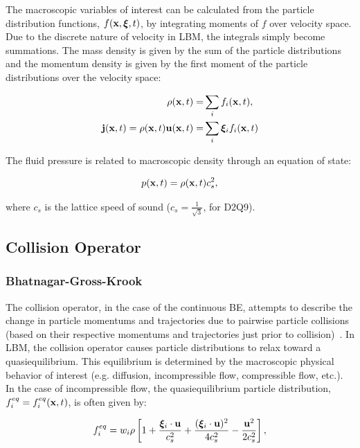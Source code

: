 The macroscopic variables of interest can be calculated from the particle distribution functions, $f(\mathbf{x}, \boldsymbol{\xi}, t)$, by integrating moments of $f$ over velocity space.
Due to the discrete nature of velocity in LBM, the integrals simply become summations.
The mass density is given by the sum of the particle distributions and the momentum density is given by the first moment of the particle distributions over the velocity space:

\begin{align}
\label{eq:rho} \rho(\mathbf{x}, t) =& \sum_{i} f_i(\mathbf{x}, t), \\
\label{eq:mom} \mathbf{j}(\mathbf{x}, t) = \rho(\mathbf{x}, t) \mathbf{u}(\mathbf{x}, t) =& \sum_{i} \boldsymbol{\xi}_i f_i(\mathbf{x}, t)
\end{align}

\noindent The fluid pressure is related to macroscopic density through an equation of state:

\begin{equation}
\label{eq:pres} p(\mathbf{x}, t) = \rho(\mathbf{x}, t) c_s^2,
\end{equation}

\noindent where $c_s$ is the lattice speed of sound ($c_s = \frac{1}{\sqrt{3}}$, for D2Q9).

\subsection{Collision Operator} \label{sec:colop}

\subsubsection{Bhatnagar-Gross-Krook} \label{sec:bgk}

The collision operator, in the case of the continuous BE, attempts to describe the change in particle momentums and trajectories due to pairwise particle collisions (based on their respective momentums and trajectories just prior to collision)~\cite{Cer90}.
In LBM, the collision operator causes particle distributions to relax toward a quasiequilibrium. %
This equilibrium is determined by the macroscopic physical behavior of interest (e.g. diffusion, incompressible flow, compressible flow, etc.).
In the case of incompressible flow, the quasiequilibrium particle distribution, $f_i^{eq} = f_i^{eq}(\mathbf{x}, t)$, is often given by:

\begin{equation} \label{eq:feq}
  f_i^{eq} = w_i \rho \left[1 + \frac{\boldsymbol{\xi}_i \cdot \mathbf{u}}{c_s^2} + \frac{(\boldsymbol{\xi}_i \cdot \mathbf{u})^2}{4c_s^2} - \frac{\mathbf{u}^2}{2c_s^2} \right],
\end{equation}

